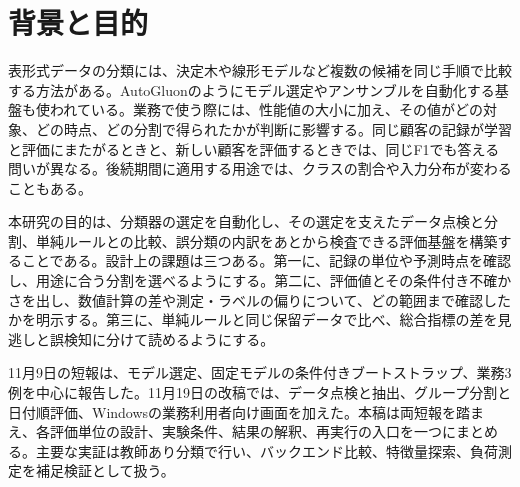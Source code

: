 \section{背景と目的}\label{sec:background}

表形式データの分類には、決定木や線形モデルなど複数の候補を同じ手順で比較する方法がある。AutoGluonのようにモデル選定やアンサンブルを自動化する基盤も使われている\cite{autogluon}。業務で使う際には、性能値の大小に加え、その値がどの対象、どの時点、どの分割で得られたかが判断に影響する。同じ顧客の記録が学習と評価にまたがるときと、新しい顧客を評価するときでは、同じF1でも答える問いが異なる。後続期間に適用する用途では、クラスの割合や入力分布が変わることもある。

本研究の目的は、分類器の選定を自動化し、その選定を支えたデータ点検と分割、単純ルールとの比較、誤分類の内訳をあとから検査できる評価基盤を構築することである。設計上の課題は三つある。第一に、記録の単位や予測時点を確認し、用途に合う分割を選べるようにする。第二に、評価値とその条件付き不確かさを出し、数値計算の差や測定・ラベルの偏りについて、どの範囲まで確認したかを明示する。第三に、単純ルールと同じ保留データで比べ、総合指標の差を見逃しと誤検知に分けて読めるようにする。

11月9日の短報は、モデル選定、固定モデルの条件付きブートストラップ、業務3例を中心に報告した。11月19日の改稿では、データ点検と抽出、グループ分割と日付順評価、Windowsの業務利用者向け画面を加えた\cite{letters,milestone}。本稿は両短報を踏まえ、各評価単位の設計、実験条件、結果の解釈、再実行の入口を一つにまとめる。主要な実証は教師あり分類で行い、バックエンド比較、特徴量探索、負荷測定を補足検証として扱う。
